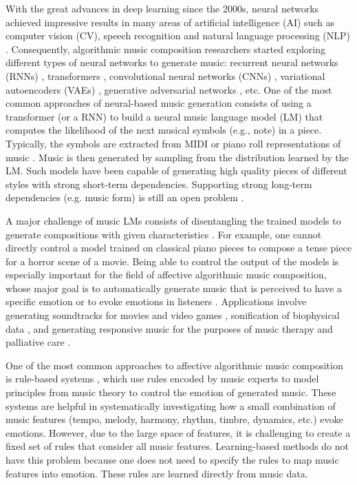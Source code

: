 With the great advances in deep learning since the 2000s, neural networks achieved impressive results in many areas of artificial intelligence (AI) such as computer vision (CV), speech recognition and natural language processing (NLP) \cite{goodfellow2016deep}. Consequently, algorithmic music composition researchers started exploring different types of neural networks to generate music: recurrent neural networks (RNNs) \cite{oore2017learning}, transformers \cite{huang2018music}, convolutional neural networks (CNNs) \cite{huang2019counterpoint}, variational autoencoders (VAEs) \cite{roberts2018hierarchical}, generative adversarial networks \cite{dong2018musegan}, etc. One of the most common approaches of neural-based music generation consists of using a transformer (or a RNN) to build a neural music language model (LM) that computes the likelihood of the next musical symbols (e.g., note) in a piece. Typically, the symbols are extracted from MIDI or piano roll representations of music \cite{briot2017deep}. Music is then generated by sampling from the distribution learned by the LM. Such models have been capable of generating high quality pieces of different styles with strong short-term dependencies. Supporting strong long-term dependencies (e.g. music form) is still an open problem \cite{briot2017deep}.

A major challenge of music LMs consists of disentangling the trained models to generate compositions with given characteristics \cite{ferreira_2019}. For example, one cannot directly control a model trained on classical piano pieces to compose a tense piece for a horror scene of a movie. Being able to control the output of the models is especially important for the field of affective algorithmic music composition, whose major goal is to automatically generate music that is perceived to have a specific emotion or to evoke emotions in listeners \cite{williams2015investigating}. Applications involve generating soundtracks for movies and video games \cite{williams2015dynamic}, sonification of biophysical data \cite{Chen2015}, and generating responsive music for the purposes of music therapy and palliative care \cite{miranda2011brain}.

One of the most common approaches to affective algorithmic music composition is rule-based systems \cite{williams2015investigating}, which use rules encoded by music experts to model principles
from music theory to control the emotion of generated music. These systems are helpful in systematically investigating how a small combination of music features (tempo, melody, harmony, rhythm, timbre, dynamics, etc.) evoke emotions. However, due to the large space of features, it is challenging to create a fixed set of rules that consider all music features. Learning-based methods do not have this problem because one does not need to specify the rules to map music features into emotion. These rules are learned directly from music data.

